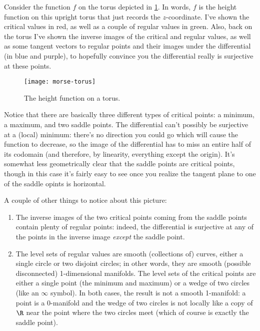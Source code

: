 \begin{example}
	Consider the function $f$ on the torus depicted in \cref{fig:morse-torus}. In words, $f$ is the height function on this upright torus that just records the $z$-coordinate. I've shown the critical values in red, as well as a couple of regular values in green. Also, back on the torus I've shown the inverse images of the critical and regular values, as well as some tangent vectors to regular points and their images under the differential (in blue and purple), to hopefully convince you the differential really is surjective at these points.
	
	\begin{figure}[htbp]
		\centering
			\texttt{[image: morse-torus]}
		\caption{The height function on a torus.}
		\label{fig:morse-torus}
	\end{figure}
	
	Notice that there are basically three different types of critical points: a minimum, a maximum, and two saddle points. The differential can't possibly be surjective at a (local) minimum: there's no direction you could go which will cause the function to decrease, so the image of the differential has to miss an entire half of its codomain (and therefore, by linearity, everything except the origin). It's somewhat less geometrically clear that the saddle points are critical points, though in this case it's fairly easy to see once you realize the tangent plane to one of the saddle opints is horizontal.
	
	A couple of other things to notice about this picture:
	\begin{enumerate}
		\item The inverse images of the two critical points coming from the saddle points contain plenty of regular points: indeed, the differential is surjective at any of the points in the inverse image \emph{except} the saddle point.
		
		\item The level sets of regular values are smooth (collections of) curves, either a single circle or two disjoint circles; in other words, they are smooth (possible disconnected) 1-dimensional manifolds. The level sets of the critical points are either a single point (the minimum and maximum) or a wedge of two circles (like an $\infty$ symbol). In both cases, the result is not a smooth 1-manifold: a point is a 0-manifold and the wedge of two circles is not locally like a copy of $\R$ near the point where the two circles meet (which of course is exactly the saddle point).
	\end{enumerate}
\end{example}

